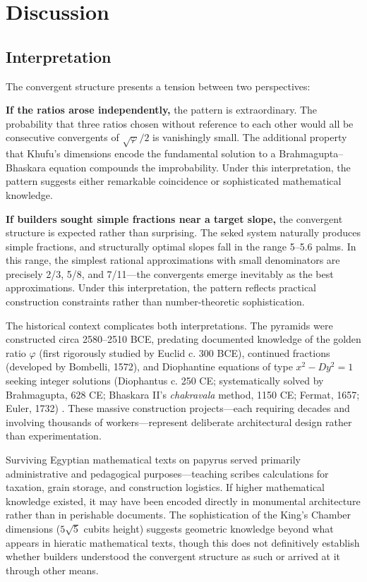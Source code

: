 \documentclass[11pt]{article}
\theoremstyle{definition}
\theoremstyle{remark}
\begin{document}
\section{Discussion}

\subsection{Interpretation}

The convergent structure presents a tension between two perspectives:

\textbf{If the ratios arose independently,} the pattern is extraordinary. The probability that three ratios chosen without reference to each other would all be consecutive convergents of $\sqrt{\varphi}/2$ is vanishingly small. The additional property that Khufu's dimensions encode the fundamental solution to a Brahmagupta--Bhaskara equation compounds the improbability. Under this interpretation, the pattern suggests either remarkable coincidence or sophisticated mathematical knowledge.

\textbf{If builders sought simple fractions near a target slope,} the convergent structure is expected rather than surprising. The seked system naturally produces simple fractions, and structurally optimal slopes fall in the range 5--5.6 palms. In this range, the simplest rational approximations with small denominators are precisely 2/3, 5/8, and 7/11—the convergents emerge inevitably as the best approximations. Under this interpretation, the pattern reflects practical construction constraints rather than number-theoretic sophistication.

The historical context complicates both interpretations. The pyramids were constructed circa 2580--2510 BCE, predating documented knowledge of the golden ratio $\varphi$ (first rigorously studied by Euclid c. 300 BCE), continued fractions (developed by Bombelli, 1572), and Diophantine equations of type $x^2 - Dy^2 = 1$ seeking integer solutions (Diophantus c. 250 CE; systematically solved by Brahmagupta, 628 CE; Bhaskara II's \emph{chakravala} method, 1150 CE; Fermat, 1657; Euler, 1732) \cite{mactutor-pell}. These massive construction projects—each requiring decades and involving thousands of workers—represent deliberate architectural design rather than experimentation.

Surviving Egyptian mathematical texts on papyrus \cite{rhind,vymazalova2006} served primarily administrative and pedagogical purposes—teaching scribes calculations for taxation, grain storage, and construction logistics. If higher mathematical knowledge existed, it may have been encoded directly in monumental architecture rather than in perishable documents. The sophistication of the King's Chamber dimensions ($5\sqrt{5}$ cubits height) suggests geometric knowledge beyond what appears in hieratic mathematical texts, though this does not definitively establish whether builders understood the convergent structure as such or arrived at it through other means.
\end{document}
